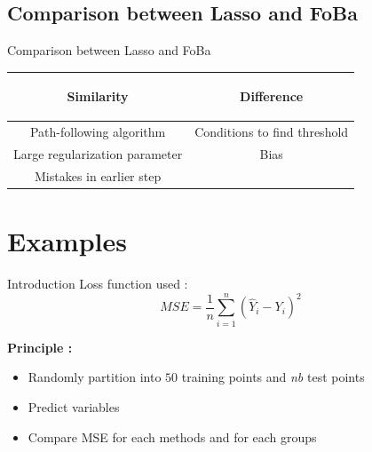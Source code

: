 \documentclass[unknownkeysallowed]{beamer}
\begin{document}

\subsection*{Comparison between Lasso and FoBa}

\begin{frame}{Comparison between Lasso and FoBa}

\begin{table}
        \centering
        \begin{tabular}{| c | c |}
        \hline
        \begin{bf} Similarity \end{bf} &
        \begin{bf} Difference \end{bf} \\
        \hline
        Path-following algorithm &  Conditions to find threshold \\
        Large regularization parameter & Bias \\
        Mistakes in earlier step &  \\
        \hline
        \end{tabular}
    \end{table}
\end{frame}



\section{Examples}
\label{sec:example}

\begin{frame}{Introduction}
Loss function used : \[MSE = \frac{1}{n} \sum_{i=1}^n (\hat{Y}_i-Y_i)^2\]

\textbf{Principle : } 
\begin{itemize}
    \item Randomly partition into $50$ training points and \textit{nb} test points
    \item Predict variables
    \item Compare MSE for each methods and for each groups
\end{itemize}
\end{frame}
\end{document}
